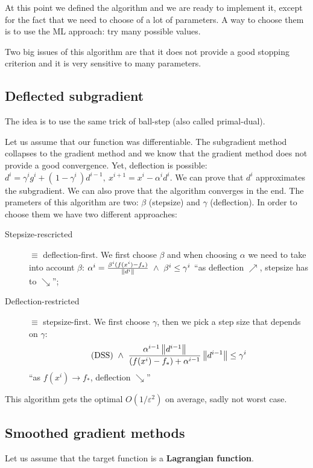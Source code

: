 \documentclass[computational_mathematics.tex]{subfiles}
\begin{document}
At this point we defined the algorithm and we are ready to implement it, except for the fact that we need to choose of a lot of parameters.
A way to choose them is to use the ML approach: try many possible values.

Two big issues of this algorithm are that it does not provide a good stopping criterion and it is very sensitive to many parameters.

\subsection{Deflected subgradient}

The idea is to use the same trick of ball-step (also called primal-dual).

Let us assume that our function was differentiable. The subgradient method collapses to the gradient method and we know that the gradient method does not provide a good convergence.
Yet, deflection is possible: $d^i = \gamma^i g^i  + ( \, 1 - \gamma^i \, ) d^{i-1},~x^{i+1} = x^i - \alpha^i d^i$.
We can prove that $d^i$ approximates the subgradient.
We can also prove that the algorithm converges in the end.
The prameters of this algorithm are two: $\beta$ (stepsize) and $\gamma$ (deflection).
In order to choose them we have two different approaches:
\begin{description}
  \item[{\sc Stepsize-rescricted}]$\equiv$ deflection-first. We first choose $\beta$ and when choosing $\alpha$ we need to take into account $\beta$:
    $\alpha^i = \frac{\beta^i (f(x^i) - f_*)}{\left\lVert d^i\right\rVert}~\wedge~\beta^i \leq \gamma^i$ ``as deflection $\nearrow$, stepsize has to $\searrow$'';
  \item[{\sc Deflection-restricted}] $\equiv$ stepsize-first. We first choose $\gamma$, then we pick a step size that depends on $\gamma$: 
  \[
    \text{(DSS)}~\wedge~ \frac{\alpha^{i-1} \left\lVert d^{i-1}\right\rVert}{(f(x^i) - f_*) + \alpha^{i-1}}\left\lVert d^{i-1}\right\rVert \leq \gamma^i
  \]
  ``as $f(x^i) \to f_*$, deflection $\searrow$''
\end{description}

This algorithm gets the optimal $O(1/\varepsilon^2)$ on average, sadly not worst case.

\subsection{Smoothed gradient methods}

Let us assume that the target function is a \textbf{Lagrangian function}.
\end{document}

